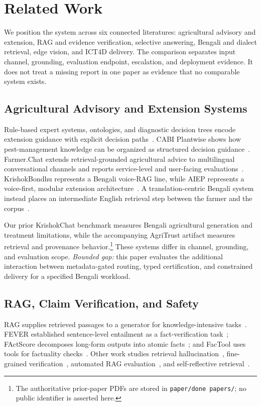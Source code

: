 \documentclass[11pt,a4paper]{article}
\begin{document}
\section{Related Work}
\label{sec:related_work}

We position the system across six connected literatures: agricultural advisory and extension, RAG and evidence verification, selective answering, Bengali and dialect retrieval, edge vision, and ICT4D delivery. The comparison separates input channel, grounding, evaluation endpoint, escalation, and deployment evidence. It does not treat a missing report in one paper as evidence that no comparable system exists.

\subsection{Agricultural Advisory and Extension Systems}
Rule-based expert systems, ontologies, and diagnostic decision trees encode extension guidance with explicit decision paths~\cite{liao2005expert, prasad2008hybrid}. CABI Plantwise shows how pest-management knowledge can be organized as structured decision guidance~\cite{cabi2020plantwise}. Farmer.Chat extends retrieval-grounded agricultural advice to multilingual conversational channels and reports service-level and user-facing evaluations~\cite{farmerchat2024}. KrishokBondhu represents a Bengali voice-RAG line, while AIEP represents a voice-first, modular extension architecture~\cite{krishokbondhu2025,aiep2026}. A translation-centric Bengali system instead places an intermediate English retrieval step between the farmer and the corpus~\cite{crosslingualbengali2026}.

Our prior KrishokChat benchmark measures Bengali agricultural generation and treatment limitations, while the accompanying AgriTrust artifact measures retrieval and provenance behavior.\footnote{The authoritative prior-paper PDFs are stored in \texttt{paper/done papers/}; no public identifier is asserted here.} These systems differ in channel, grounding, and evaluation scope. \textit{Bounded gap:} this paper evaluates the additional interaction between metadata-gated routing, typed certification, and constrained delivery for a specified Bengali workload.

\subsection{RAG, Claim Verification, and Safety}
RAG supplies retrieved passages to a generator for knowledge-intensive tasks~\cite{lewis2020rag, gao2023ragsurvey}. FEVER established sentence-level entailment as a fact-verification task~\cite{thorne2018fever}; FActScore decomposes long-form outputs into atomic facts~\cite{min2023factscore}; and FacTool uses tools for factuality checks~\cite{chern2023factool}. Other work studies retrieval hallucination~\cite{ren2024investigating, varshney2023stitch}, fine-grained verification~\cite{malladi2024fine}, automated RAG evaluation~\cite{es2024ragas}, and self-reflective retrieval~\cite{asai2024selfrag}.
\end{document}
